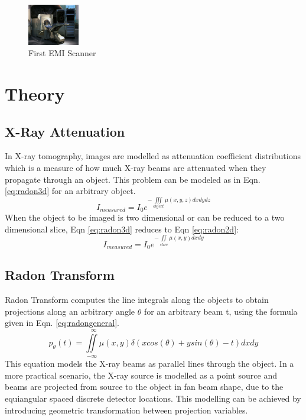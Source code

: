 \documentclass[journal]{IEEEtran}
\begin{document}
\begin{figure}[h]
\centering
\includegraphics[width=0.2\textwidth]{images/CT.jpg}
\centering \caption{First EMI Scanner \cite{emict}}\label{fig:CT1010}
\end{figure}

\vfill{\null}

\section{Theory} \label{sec:theory}
\subsection{X-Ray Attenuation}
In X-ray tomography, images are modelled as attenuation coefficient distributions which is a measure of how much X-ray beams are attenuated when they propagate through an object. This problem can be modeled as in Eqn. \ref{eq:radon3d} for an arbitrary object.
\begin{equation} 
	I_{measured} = I_0 e^{-\iiint\limits_{object}\mu(x,y,z)dxdydz}
	\label{eq:radon3d}
\end{equation}
When the object to be imaged is two dimensional or can be reduced to a two dimensional slice, Eqn \ref{eq:radon3d} reduces to Eqn \ref{eq:radon2d}:
\begin{equation}
	I_{measured} = I_0 e^{-\iint\limits_{slice}\mu(x,y)dxdy}
	\label{eq:radon2d}
\end{equation}
\subsection{Radon Transform}
Radon Transform computes the line integrals along the objects to obtain projections along an arbitrary angle $\theta$ for an arbitrary beam t, using the formula given in Eqn. \ref{eq:radongeneral}.
\begin{equation}
	p_{\theta}(t) = \iint\limits_{-\infty}^{\ \ \ \infty}\mu(x,y)\delta(xcos(\theta)+ysin(\theta)-t)dxdy
	\label{eq:radongeneral}
\end{equation}
This equation models the X-ray beams as parallel lines through the object. In a more practical scenario, the X-ray source is modelled as a point source and beams are projected from source to the object in fan beam shape, due to the equiangular spaced discrete detector locations. This modelling can be achieved by introducing geometric transformation between projection variables. 
\end{document}
